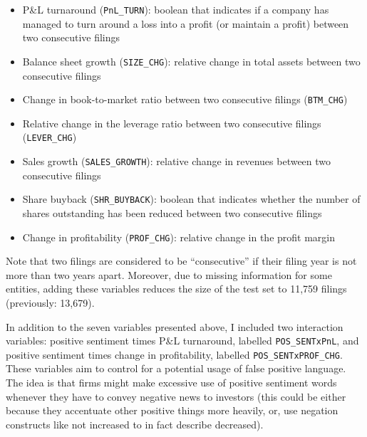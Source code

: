\begin{itemize}
\item P\&L turnaround (\texttt{PnL\_TURN}): boolean that indicates if a company has managed to turn around a loss into a profit (or maintain a profit) between two consecutive filings
\item Balance sheet growth (\texttt{SIZE\_CHG}): relative change in total assets between two consecutive filings
\item Change in book-to-market ratio between two consecutive filings (\texttt{BTM\_CHG})
\item Relative change in the leverage ratio between two consecutive filings (\texttt{LEVER\_CHG})
\item Sales growth (\texttt{SALES\_GROWTH}): relative change in revenues between two consecutive filings
\item Share buyback (\texttt{SHR\_BUYBACK}): boolean that indicates whether the number of shares outstanding has been reduced between two consecutive filings
\item Change in profitability (\texttt{PROF\_CHG}): relative change in the profit margin
\end{itemize}

Note that two filings are considered to be \enquote{consecutive} if their filing year is not more than two years apart. Moreover, due to missing information for some entities, adding these variables reduces the size of the test set to 11,759 filings (previously: 13,679).

In addition to the seven variables presented above, I included two interaction variables: positive sentiment times P\&L turnaround, labelled \texttt{POS\_SENTxPnL}, and positive sentiment times change in profitability, labelled \texttt{POS\_SENTxPROF\_CHG}. These variables aim to control for a potential usage of false positive language. The idea is that firms might make excessive use of positive sentiment words whenever they have to convey negative news to investors (this could be either because they accentuate other positive things more heavily, or, use negation constructs like \textsf{not increased} to in fact describe \textsf{decreased}). 


